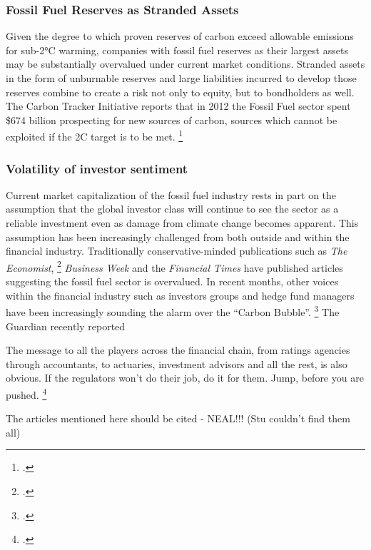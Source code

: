 \subsubsection {Fossil Fuel Reserves as Stranded Assets} 



Given the degree to which proven reserves of carbon exceed allowable emissions for sub-2°C warming, companies with fossil fuel reserves as their largest assets may be substantially overvalued under current market conditions. 
Stranded assets in the form of unburnable reserves and large liabilities incurred to develop those reserves combine to create a risk not only to equity, but to bondholders as well.
The Carbon Tracker Initiative reports that in 2012 the Fossil Fuel sector spent \$674 billion prospecting for new sources of carbon, sources which cannot be exploited if the 2C target is to be met. \footcite{CTI2013}



\subsubsection {Volatility of investor sentiment}



Current market capitalization of the fossil fuel industry rests in part on the assumption that the global investor class will continue to see the sector as a reliable investment even as damage from climate change becomes apparent. 
This assumption has been increasingly challenged from both outside and within the financial industry. 
Traditionally conservative-minded publications such as \emph{The Economist}, \footcite{EconomistUnburnable} \emph{Business Week} and the \emph{Financial Times} have published articles suggesting the fossil fuel sector is overvalued. 
In recent months, other voices within the financial industry such as investors groups and hedge fund managers have been increasingly sounding the alarm over the ``Carbon Bubble''. \footcite{JeremyGrantham} 
The Guardian recently reported
\begin{slquote}
The message to all the players across the financial chain, from ratings agencies through accountants, to actuaries, investment advisors and all the rest, is also obvious. If the regulators won’t do their job, do it for them. Jump, before you are pushed. \footcite{Guardian6Trillion}
\end{slquote}


\begin{vcom}
  The articles mentioned here should be cited - NEAL!!! (Stu couldn't find them all)
\end{vcom}



